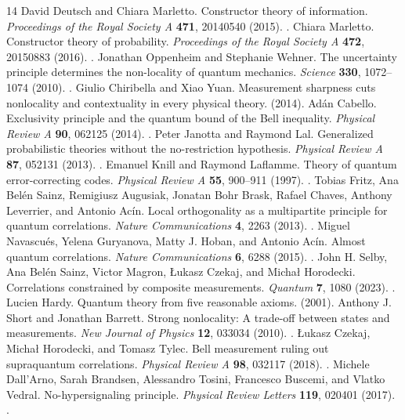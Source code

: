 \begin{thebibliography}{14}
 David Deutsch and Chiara Marletto. Constructor theory of information. \emph{Proceedings of the Royal Society A} \textbf{471}, 20140540 (2015). .
 Chiara Marletto. Constructor theory of probability. \emph{Proceedings of the Royal Society A} \textbf{472}, 20150883 (2016). .
 Jonathan Oppenheim and Stephanie Wehner. The uncertainty principle determines the non-locality of quantum mechanics. \emph{Science} \textbf{330}, 1072--1074 (2010). .
 Giulio Chiribella and Xiao Yuan. Measurement sharpness cuts nonlocality and contextuality in every physical theory.  (2014).
 Ad\'an Cabello. Exclusivity principle and the quantum bound of the Bell inequality. \emph{Physical Review A} \textbf{90}, 062125 (2014). .
 Peter Janotta and Raymond Lal. Generalized probabilistic theories without the no-restriction hypothesis. \emph{Physical Review A} \textbf{87}, 052131 (2013). .
 Emanuel Knill and Raymond Laflamme. Theory of quantum error-correcting codes. \emph{Physical Review A} \textbf{55}, 900--911 (1997). .
 Tobias Fritz, Ana Bel\'en Sainz, Remigiusz Augusiak, Jonatan Bohr Brask, Rafael Chaves, Anthony Leverrier, and Antonio Ac\'in. Local orthogonality as a multipartite principle for quantum correlations. \emph{Nature Communications} \textbf{4}, 2263 (2013). .
 Miguel Navascu\'es, Yelena Guryanova, Matty J. Hoban, and Antonio Ac\'in. Almost quantum correlations. \emph{Nature Communications} \textbf{6}, 6288 (2015). .
 John H. Selby, Ana Bel\'en Sainz, Victor Magron, \L ukasz Czekaj, and Micha\l{} Horodecki. Correlations constrained by composite measurements. \emph{Quantum} \textbf{7}, 1080 (2023). .
 Lucien Hardy. Quantum theory from five reasonable axioms.  (2001).
 Anthony J. Short and Jonathan Barrett. Strong nonlocality: A trade-off between states and measurements. \emph{New Journal of Physics} \textbf{12}, 033034 (2010). .
 \L ukasz Czekaj, Micha\l{} Horodecki, and Tomasz Tylec. Bell measurement ruling out supraquantum correlations. \emph{Physical Review A} \textbf{98}, 032117 (2018). .
 Michele Dall'Arno, Sarah Brandsen, Alessandro Tosini, Francesco Buscemi, and Vlatko Vedral. No-hypersignaling principle. \emph{Physical Review Letters} \textbf{119}, 020401 (2017). .
\end{thebibliography}